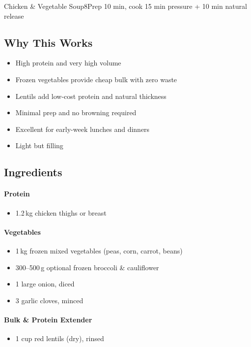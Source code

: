 \begin{recipebox}{Chicken \& Vegetable Soup}{8}{Prep 10 min, cook 15 min pressure + 10 min natural release}
\subsection*{Why This Works}
\begin{itemize}
    \item High protein and very high volume
    \item Frozen vegetables provide cheap bulk with zero waste
    \item Lentils add low-cost protein and natural thickness
    \item Minimal prep and no browning required
    \item Excellent for early-week lunches and dinners
    \item Light but filling
\end{itemize}

\subsection*{Ingredients}

\paragraph{Protein}
\begin{itemize}
    \item 1.2\,kg chicken thighs or breast
\end{itemize}

\paragraph{Vegetables}
\begin{itemize}
    \item 1\,kg frozen mixed vegetables (peas, corn, carrot, beans)
    \item 300--500\,g optional frozen broccoli \& cauliflower
    \item 1 large onion, diced
    \item 3 garlic cloves, minced
\end{itemize}

\paragraph{Bulk \& Protein Extender}
\begin{itemize}
    \item 1 cup red lentils (dry), rinsed
\end{itemize}


\end{recipebox}
